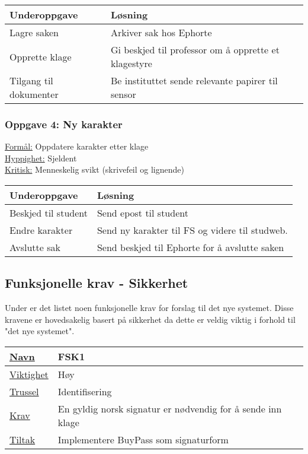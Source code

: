 \begin{tabularx}{\textwidth}{|l|X|}
  \hline
  Underoppgave & Løsning \\ \hline
  Lagre saken & Arkiver sak hos Ephorte \\ \hline
  Opprette klage & Gi beskjed til professor om å opprette et klagestyre \\ \hline
  Tilgang til dokumenter & Be instituttet sende relevante papirer til sensor \\ \hline
\end{tabularx}

\subsubsection*{Oppgave 4: Ny karakter}

\underline{Formål:} Oppdatere karakter etter klage\\
\underline{Hyppighet:} Sjeldent\\
\underline{Kritisk:} Menneskelig svikt (skrivefeil og lignende)

\begin{tabularx}{\textwidth}{|l|X|}
  \hline
  Underoppgave & Løsning \\ \hline
  Beskjed til student & Send epost til student \\ \hline
  Endre karakter & Send ny karakter til FS og videre til studweb. \\ \hline
  Avslutte sak & Send beskjed til Ephorte for å avslutte saken \\ \hline
\end{tabularx}


\subsection{Funksjonelle krav - Sikkerhet}

Under er det listet noen funksjonelle krav for forslag til det nye systemet. Disse kravene er hovedsakelig basert på sikkerhet da dette er veldig viktig i forhold til "det nye systemet". 

\begin{tabularx}{\textwidth}{|l|X|}
  \hline
  \underline{Navn} & FSK1 \\ \hline
  \underline{Viktighet} & Høy \\ \hline
  \underline{Trussel} & Identifisering \\ \hline
  \underline{Krav} & En gyldig norsk signatur er nødvendig for å sende inn klage \\ \hline
  \underline{Tiltak} & Implementere BuyPass som signaturform \\ \hline
\end{tabularx}

